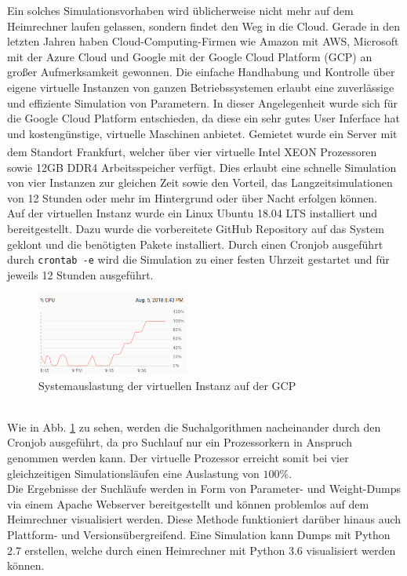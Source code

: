 		Ein solches Simulationsvorhaben wird üblicherweise nicht mehr auf dem Heimrechner laufen gelassen, sondern findet den Weg in die Cloud. Gerade in den letzten Jahren haben Cloud-Computing-Firmen wie Amazon mit AWS, Microsoft mit der Azure Cloud und Google mit der Google Cloud Platform (GCP) an großer Aufmerksamkeit gewonnen. Die einfache Handhabung und Kontrolle über eigene virtuelle Instanzen von ganzen Betriebssystemen erlaubt eine zuverlässige und effiziente Simulation von Parametern. In dieser Angelegenheit wurde sich für die Google Cloud Platform entschieden, da diese ein sehr gutes User Inferface hat und kostengünstige, virtuelle Maschinen anbietet. Gemietet wurde ein Server mit dem Standort Frankfurt, welcher über vier virtuelle Intel XEON\textsuperscript{\textregistered} Prozessoren sowie 12GB DDR4 Arbeitsspeicher verfügt. Dies erlaubt eine schnelle Simulation von vier Instanzen zur gleichen Zeit sowie den Vorteil, das Langzeitsimulationen von 12 Stunden oder mehr im Hintergrund oder über Nacht erfolgen können.\\
		Auf der virtuellen Instanz wurde ein Linux Ubuntu 18.04 LTS installiert und bereitgestellt. Dazu wurde die vorbereitete GitHub Repository \cite{BA} auf das System geklont und die benötigten Pakete installiert. Durch einen Cronjob ausgeführt durch \texttt{crontab -e} wird die Simulation zu einer festen Uhrzeit gestartet und für jeweils 12 Stunden ausgeführt.
		\begin{figure}[!h] %
			\centering
			\includegraphics[width=5cm]{figures/chap_implement/GCP.png}
			\caption{Systemauslastung der virtuellen Instanz auf der GCP}
			\label{fig:gcp_1}
		\end{figure}\\
		Wie in Abb. \ref{fig:gcp_1} zu sehen, werden die Suchalgorithmen nacheinander durch den Cronjob ausgeführt, da pro Suchlauf nur ein Prozessorkern in Anspruch genommen werden kann. Der virtuelle Prozessor erreicht somit bei vier gleichzeitigen Simulationsläufen eine Auslastung von $100\%$.\\
		Die Ergebnisse der Suchläufe werden in Form von Parameter- und Weight-Dumps via einem Apache Webserver bereitgestellt und können problemlos auf dem Heimrechner visualisiert werden. Diese Methode funktioniert darüber hinaus auch Plattform- und Versionsübergreifend. Eine Simulation kann Dumps mit Python 2.7 erstellen, welche durch einen Heimrechner mit Python 3.6 visualisiert werden können.


